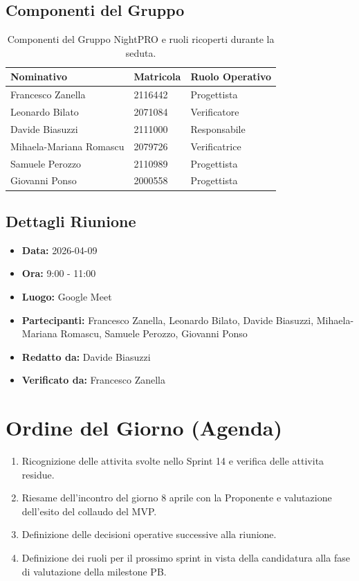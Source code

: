 \documentclass[a4paper, 11pt, oneside]{scrartcl}
\begin{document}
\subsection{Componenti del Gruppo}
\begin{table}[h!]
\centering
\begin{tabular}{@{}lll@{}}
\toprule
\textbf{Nominativo} & \textbf{Matricola} & \textbf{Ruolo Operativo} \\
\midrule
Francesco Zanella & 2116442 & Progettista \\
Leonardo Bilato & 2071084 & Verificatore \\
Davide Biasuzzi & 2111000 & Responsabile \\
Mihaela-Mariana Romascu & 2079726 & Verificatrice \\
Samuele Perozzo & 2110989 & Progettista \\
Giovanni Ponso & 2000558 & Progettista \\
\bottomrule
\end{tabular}
\caption{Componenti del Gruppo NightPRO e ruoli ricoperti durante la seduta.}
\end{table}

\subsection{Dettagli Riunione}
\begin{itemize}
	\item \textbf{Data:} 2026-04-09
	\item \textbf{Ora:} 9:00 - 11:00
	\item \textbf{Luogo:} Google Meet
	\item \textbf{Partecipanti:} Francesco Zanella, Leonardo Bilato, Davide Biasuzzi, Mihaela-Mariana Romascu, Samuele Perozzo, Giovanni Ponso
	\item \textbf{Redatto da:} Davide Biasuzzi
	\item \textbf{Verificato da:} Francesco Zanella
\end{itemize}

\newpage
\section{Ordine del Giorno (Agenda)}
\begin{enumerate}
	\item Ricognizione delle attivita svolte nello Sprint 14 e verifica delle attivita residue.
	\item Riesame dell'incontro del giorno 8 aprile con la Proponente e valutazione dell'esito del collaudo del MVP.
	\item Definizione delle decisioni operative successive alla riunione.
	\item Definizione dei ruoli per il prossimo sprint in vista della candidatura alla fase di valutazione della milestone PB.
\end{enumerate}
\end{document}
